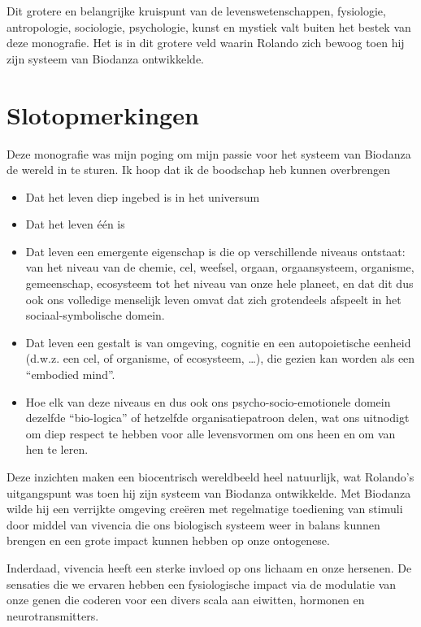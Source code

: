 \documentclass[
  11pt,
]{book}
\begin{document}
Dit grotere en belangrijke kruispunt van de levenswetenschappen, fysiologie, antropologie, sociologie, psychologie, kunst en mystiek valt buiten het bestek van deze monografie. Het is in dit grotere veld waarin Rolando zich bewoog toen hij zijn systeem van Biodanza ontwikkelde.

\hypertarget{slotopmerkingen}{%
\chapter{Slotopmerkingen}\label{slotopmerkingen}}

Deze monografie was mijn poging om mijn passie voor het systeem van Biodanza de wereld in te sturen. Ik hoop dat ik de boodschap heb kunnen overbrengen

\begin{itemize}
\item
  Dat het leven diep ingebed is in het universum
\item
  Dat het leven één is
\item
  Dat leven een emergente eigenschap is die op verschillende niveaus ontstaat: van het niveau van de chemie, cel, weefsel, orgaan, orgaansysteem, organisme, gemeenschap, ecosysteem tot het niveau van onze hele planeet, en dat dit dus ook ons volledige menselijk leven omvat dat zich grotendeels afspeelt in het sociaal-symbolische domein.
\item
  Dat leven een gestalt is van omgeving, cognitie en een autopoietische eenheid (d.w.z. een cel, of organisme, of ecosysteem, \ldots), die gezien kan worden als een ``embodied mind''.
\item
  Hoe elk van deze niveaus en dus ook ons psycho-socio-emotionele domein dezelfde ``bio-logica'' of hetzelfde organisatiepatroon delen, wat ons uitnodigt om diep respect te hebben voor alle levensvormen om ons heen en om van hen te leren.
\end{itemize}

Deze inzichten maken een biocentrisch wereldbeeld heel natuurlijk, wat Rolando's uitgangspunt was toen hij zijn systeem van Biodanza ontwikkelde. Met Biodanza wilde hij een verrijkte omgeving creëren met regelmatige toediening van stimuli door middel van vivencia die ons biologisch systeem weer in balans kunnen brengen en een grote impact kunnen hebben op onze ontogenese.

Inderdaad, vivencia heeft een sterke invloed op ons lichaam en onze hersenen. De sensaties die we ervaren hebben een fysiologische impact via de modulatie van onze genen die coderen voor een divers scala aan eiwitten, hormonen en neurotransmitters.
\end{document}
